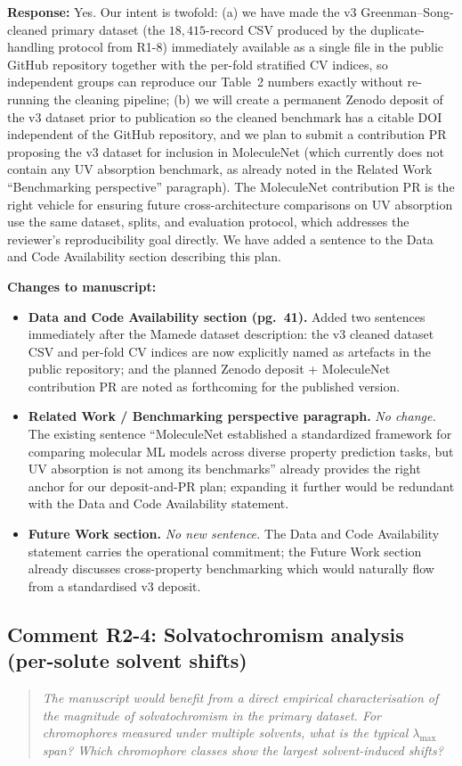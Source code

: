 \documentclass[11pt]{article}
\newenvironment{reviewer}{%
  \begin{quote}\itshape\color{black!70}}{%
  \end{quote}}
\newcommand{\response}[1]{\noindent\textbf{Response:} #1\par\medskip}
\newenvironment{changes}{%
  \noindent\textbf{Changes to manuscript:}
  \begin{itemize}[leftmargin=2em,itemsep=2pt]}{%
  \end{itemize}\medskip}
\begin{document}
\response{Yes. Our intent is twofold: (a) we have made the v3 Greenman--Song-cleaned primary dataset (the $18{,}415$-record CSV produced by the duplicate-handling protocol from R1-8) immediately available as a single file in the public GitHub repository together with the per-fold stratified CV indices, so independent groups can reproduce our Table~2 numbers exactly without re-running the cleaning pipeline; (b) we will create a permanent Zenodo deposit of the v3 dataset prior to publication so the cleaned benchmark has a citable DOI independent of the GitHub repository, and we plan to submit a contribution PR proposing the v3 dataset for inclusion in MoleculeNet (which currently does not contain any UV absorption benchmark, as already noted in the Related Work ``Benchmarking perspective'' paragraph). The MoleculeNet contribution PR is the right vehicle for ensuring future cross-architecture comparisons on UV absorption use the same dataset, splits, and evaluation protocol, which addresses the reviewer's reproducibility goal directly. We have added a sentence to the Data and Code Availability section describing this plan.}

\begin{changes}
  \item \textbf{Data and Code Availability section (pg.\ 41).} Added two sentences immediately after the Mamede dataset description: the v3 cleaned dataset CSV and per-fold CV indices are now explicitly named as artefacts in the public repository; and the planned Zenodo deposit + MoleculeNet contribution PR are noted as forthcoming for the published version.
  \item \textbf{Related Work / Benchmarking perspective paragraph.} \emph{No change.} The existing sentence ``MoleculeNet established a standardized framework for comparing molecular ML models across diverse property prediction tasks, but UV absorption is not among its benchmarks'' already provides the right anchor for our deposit-and-PR plan; expanding it further would be redundant with the Data and Code Availability statement.
  \item \textbf{Future Work section.} \emph{No new sentence.} The Data and Code Availability statement carries the operational commitment; the Future Work section already discusses cross-property benchmarking which would naturally flow from a standardised v3 deposit.
\end{changes}

\subsection*{Comment R2-4: Solvatochromism analysis (per-solute solvent shifts)}
\begin{reviewer}
The manuscript would benefit from a direct empirical characterisation of the magnitude of solvatochromism in the primary dataset. For chromophores measured under multiple solvents, what is the typical $\lambda_{\max}$ span? Which chromophore classes show the largest solvent-induced shifts?
\end{reviewer}
\end{document}
